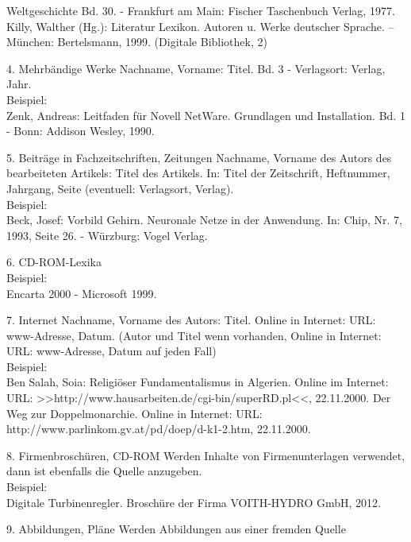 \documentclass[12pt,a4paper]{article}
\begin{document}
{{{{\begin{description*}
		Weltgeschichte Bd. 30. - Frankfurt am Main: Fischer Taschenbuch Verlag, 1977. Killy,
		Walther (Hg.): Literatur Lexikon. Autoren u. Werke deutscher Sprache. – München:
		Bertelsmann, 1999. (Digitale Bibliothek, 2)
		\vspace*{2mm}
	\item[4. Mehrbändige Werke] Nachname, Vorname: Titel. Bd. 3 - Verlagsort: Verlag, Jahr.
		\\[1mm]Beispiel:
		\\Zenk, Andreas: Leitfaden für Novell NetWare. Grundlagen und Installation. Bd. 1 - Bonn:
		Addison Wesley, 1990.
		\vspace*{2mm}
	\item[5. Beiträge in Fachzeitschriften, Zeitungen] Nachname, Vorname des Autors des bearbeiteten
		Artikels: Titel des Artikels. In: Titel der Zeitschrift, Heftnummer, Jahrgang, Seite
		(eventuell: Verlagsort, Verlag).
		\\[1mm]Beispiel:
		\\Beck, Josef: Vorbild Gehirn. Neuronale Netze in der Anwendung. In: Chip, Nr. 7, 1993,
		Seite 26. - Würzburg: Vogel Verlag.
		\vspace*{2mm}
	\item[6. CD-ROM-Lexika]\hfill
		\\[1mm]Beispiel:
		\\Encarta 2000 - Microsoft 1999.
		\vspace*{2mm}
	\item[7. Internet] Nachname, Vorname des Autors: Titel. Online in Internet: URL: www-Adresse, Datum.
		(Autor und Titel wenn vorhanden, Online in Internet: URL: www-Adresse, Datum auf
		jeden Fall)
		\\[1mm]Beispiel:
		\\Ben Salah, Soia: Religiöser Fundamentalismus in Algerien. Online im Internet:
		URL: >>http:/\slash{}www.hausarbeiten.de\slash{}cgi-bin\slash{}superRD.pl<<,
		22.11.2000. Der Weg zur Doppelmonarchie.
		Online in Internet: URL:
		http:/\slash{}www.parlinkom.gv.at\slash{}pd\slash{}doep\slash{}d-k1-2.htm,
		22.11.2000.
		\vspace*{2mm}
	\item[8. Firmenbroschüren, CD-ROM] Werden Inhalte von Firmenunterlagen verwendet,
		dann ist ebenfalls die Quelle anzugeben.
		\\[1mm]Beispiel:
		\\Digitale Turbinenregler. Broschüre der Firma VOITH-HYDRO GmbH, 2012.
		\vspace*{2mm}
	\item[9. Abbildungen, Pläne] Werden Abbildungen aus einer fremden Quelle

\end{description*}}}}}
\end{document}
